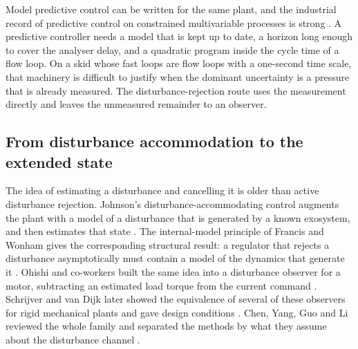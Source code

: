 Model predictive control can be written for the same plant, and the industrial record of predictive control on constrained multivariable processes is strong \cite{qin2003mpc,bequette2003process,ogunnaike1994process,stephanopoulos1984chemical}. A predictive controller needs a model that is kept up to date, a horizon long enough to cover the analyser delay, and a quadratic program inside the cycle time of a flow loop. On a skid whose fast loops are flow loops with a one-second time scale, that machinery is difficult to justify when the dominant uncertainty is a pressure that is already measured. The disturbance-rejection route uses the measurement directly and leaves the unmeasured remainder to an observer.

\subsection{From disturbance accommodation to the extended state}

The idea of estimating a disturbance and cancelling it is older than active disturbance rejection. Johnson's disturbance-accommodating control augments the plant with a model of a disturbance that is generated by a known exosystem, and then estimates that state \cite{johnson1971accommodation}. The internal-model principle of Francis and Wonham gives the corresponding structural result: a regulator that rejects a disturbance asymptotically must contain a model of the dynamics that generate it \cite{francis1976internal}. Ohishi and co-workers built the same idea into a disturbance observer for a motor, subtracting an estimated load torque from the current command \cite{ohishi1987microprocessor}. Schrijver and van Dijk later showed the equivalence of several of these observers for rigid mechanical plants and gave design conditions \cite{schrijver2002disturbance}. Chen, Yang, Guo and Li reviewed the whole family and separated the methods by what they assume about the disturbance channel \cite{chen2016dobc,li2014dobc}.

